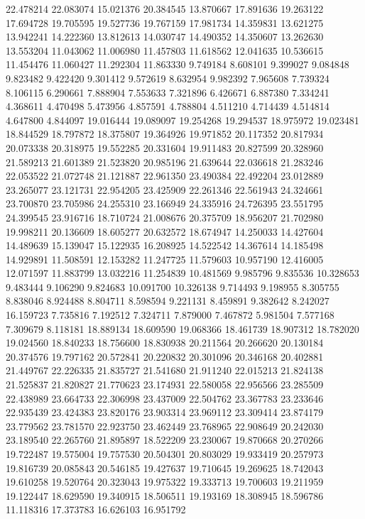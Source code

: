 22.478214
22.083074
15.021376
20.384545
13.870667
17.891636
19.263122
17.694728
19.705595
19.527736
19.767159
17.981734
14.359831
13.621275
13.942241
14.222360
13.812613
14.030747
14.490352
14.350607
13.262630
13.553204
11.043062
11.006980
11.457803
11.618562
12.041635
10.536615
11.454476
11.060427
11.292304
11.863330
9.749184
8.608101
9.399027
9.084848
9.823482
9.422420
9.301412
9.572619
8.632954
9.982392
7.965608
7.739324
8.106115
6.290661
7.888904
7.553633
7.321896
6.426671
6.887380
7.334241
4.368611
4.470498
5.473956
4.857591
4.788804
4.511210
4.714439
4.514814
4.647800
4.844097
19.016444
19.089097
19.254268
19.294537
18.975972
19.023481
18.844529
18.797872
18.375807
19.364926
19.971852
20.117352
20.817934
20.073338
20.318975
19.552285
20.331604
19.911483
20.827599
20.328960
21.589213
21.601389
21.523820
20.985196
21.639644
22.036618
21.283246
22.053522
21.072748
21.121887
22.961350
23.490384
22.492204
23.012889
23.265077
23.121731
22.954205
23.425909
22.261346
22.561943
24.324661
23.700870
23.705986
24.255310
23.166949
24.335916
24.726395
23.551795
24.399545
23.916716
18.710724
21.008676
20.375709
18.956207
21.702980
19.998211
20.136609
18.605277
20.632572
18.674947
14.250033
14.427604
14.489639
15.139047
15.122935
16.208925
14.522542
14.367614
14.185498
14.929891
11.508591
12.153282
11.247725
11.579603
10.957190
12.416005
12.071597
11.883799
13.032216
11.254839
10.481569
9.985796
9.835536
10.328653
9.483444
9.106290
9.824683
10.091700
10.326138
9.714493
9.198955
8.305755
8.838046
8.924488
8.804711
8.598594
9.221131
8.459891
9.382642
8.242027
16.159723
7.735816
7.192512
7.324711
7.879000
7.467872
5.981504
7.577168
7.309679
8.118181
18.889134
18.609590
19.068366
18.461739
18.907312
18.782020
19.024560
18.840233
18.756600
18.830938
20.211564
20.266620
20.130184
20.374576
19.797162
20.572841
20.220832
20.301096
20.346168
20.402881
21.449767
22.226335
21.835727
21.541680
21.911240
22.015213
21.824138
21.525837
21.820827
21.770623
23.174931
22.580058
22.956566
23.285509
22.438989
23.664733
22.306998
23.437009
22.504762
23.367783
23.233646
22.935439
23.424383
23.820176
23.903314
23.969112
23.309414
23.874179
23.779562
23.781570
22.923750
23.462449
23.768965
22.908649
20.242030
23.189540
22.265760
21.895897
18.522209
23.230067
19.870668
20.270266
19.722487
19.575004
19.757530
20.504301
20.803029
19.933419
20.257973
19.816739
20.085843
20.546185
19.427637
19.710645
19.269625
18.742043
19.610258
19.520764
20.323043
19.975322
19.333713
19.700603
19.211959
19.122447
18.629590
19.340915
18.506511
19.193169
18.308945
18.596786
11.118316
17.373783
16.626103
16.951792
